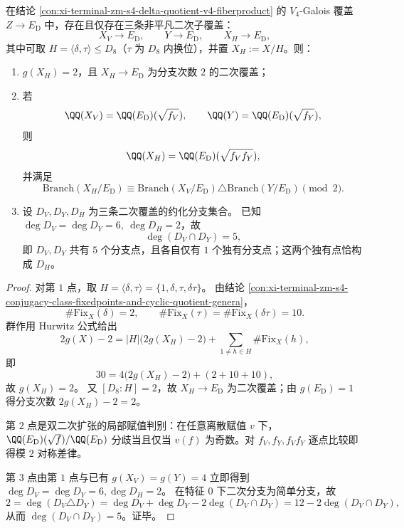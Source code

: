 \begin{conclusion}[三条二次子覆盖的分支奇偶对称差律]\label{cor:xi-terminal-zm-s4-v4-three-quad-subcovers-branch-parity}
在结论 \ref{con:xi-terminal-zm-s4-delta-quotient-v4-fiberproduct} 的 \(V_4\)-Galois 覆盖
\(
Z\to E_{\mathrm D}
\)
中，存在且仅存在三条非平凡二次子覆盖：
\[
X_V\to E_{\mathrm D},\qquad
Y\to E_{\mathrm D},\qquad
X_H\to E_{\mathrm D},
\]
其中可取 \(H=\langle\delta,\tau\rangle\le D_8\)（\(\tau\) 为 \(D_8\) 内换位），并置 \(X_H:=X/H\)。则：
\begin{enumerate}
  \item \(g(X_H)=2\)，且 \(X_H\to E_{\mathrm D}\) 为分支次数 \(2\) 的二次覆盖；
  \item 若
  \[
  \QQ(X_V)=\QQ(E_{\mathrm D})(\sqrt{f_V}),\qquad
  \QQ(Y)=\QQ(E_{\mathrm D})(\sqrt{f_Y}),
  \]
  则
  \[
  \QQ(X_H)=\QQ(E_{\mathrm D})(\sqrt{f_Vf_Y}),
  \]
  并满足
  \[
  \mathrm{Branch}(X_H/E_{\mathrm D})
  \equiv
  \mathrm{Branch}(X_V/E_{\mathrm D})\triangle \mathrm{Branch}(Y/E_{\mathrm D})
  \pmod 2.
  \]
  \item 设 \(D_V,D_Y,D_H\) 为三条二次覆盖的约化分支集合。
  已知 \(\deg D_V=\deg D_Y=6,\ \deg D_H=2\)，故
  \[
  \deg(D_V\cap D_Y)=5,
  \]
  即 \(D_V,D_Y\) 共有 \(5\) 个分支点，且各自仅有 \(1\) 个独有分支点；这两个独有点恰构成 \(D_H\)。
\end{enumerate}
\end{conclusion}
\begin{proof}
对第 \(1\) 点，取 \(H=\langle\delta,\tau\rangle=\{1,\delta,\tau,\delta\tau\}\)。
由结论 \ref{con:xi-terminal-zm-s4-conjugacy-class-fixedpoints-and-cyclic-quotient-genera}，
\[
\#\mathrm{Fix}_X(\delta)=2,\qquad
\#\mathrm{Fix}_X(\tau)=\#\mathrm{Fix}_X(\delta\tau)=10.
\]
群作用 Hurwitz 公式给出
\[
2g(X)-2=|H|\bigl(2g(X_H)-2\bigr)+\sum_{1\neq h\in H}\#\mathrm{Fix}_X(h),
\]
即
\[
30=4\bigl(2g(X_H)-2\bigr)+(2+10+10),
\]
故 \(g(X_H)=2\)。
又 \([D_8:H]=2\)，故 \(X_H\to E_{\mathrm D}\) 为二次覆盖；由 \(g(E_{\mathrm D})=1\) 得分支次数 \(2g(X_H)-2=2\)。

第 \(2\) 点是双二次扩张的局部赋值判别：在任意离散赋值 \(v\) 下，\(\QQ(E_{\mathrm D})(\sqrt{f})/\QQ(E_{\mathrm D})\) 分歧当且仅当 \(v(f)\) 为奇数。对 \(f_V,f_Y,f_Vf_Y\) 逐点比较即得模 \(2\) 对称差律。

第 \(3\) 点由第 \(1\) 点与已有 \(g(X_V)=g(Y)=4\) 立即得到 \(\deg D_V=\deg D_Y=6,\deg D_H=2\)。
在特征 \(0\) 下二次分支为简单分支，故
\[
2=\deg(D_V\triangle D_Y)=\deg D_V+\deg D_Y-2\deg(D_V\cap D_Y)=12-2\deg(D_V\cap D_Y),
\]
从而 \(\deg(D_V\cap D_Y)=5\)。证毕。
\end{proof}

